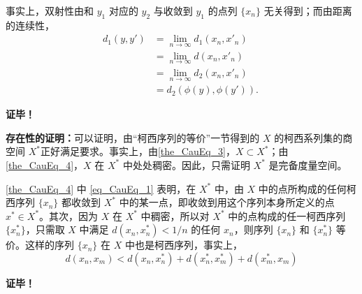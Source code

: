 事实上，双射性由和 $y_1$ 对应的 $y_2$ 与收敛到 $y_1$ 的点列 $\{x_n\}$ 无关得到；而由距离的连续性，
\begin{equation}
\begin{aligned}
d_1(y,y')&=\lim_{n\rightarrow\infty} d_1(x_n,x'_n)\\
&=\lim_{n\rightarrow\infty} d(x_n,x'_n)\\
&=\lim_{n\rightarrow\infty} d_2(x_n,x'_n)\\
&=d_2(\phi(y),\phi(y')).
\end{aligned}~
\end{equation}

\textbf{证毕！}

\textbf{存在性的证明：}可以证明，由“柯西序列的等价”一节得到的 $X$ 的柯西系列集的商空间 $X^*$正好满足要求。事实上，由\autoref{the_CauEq_3}，$X\subset X^*$；由\autoref{the_CauEq_4}，$X$ 在 $X^*$ 中处处稠密。因此，只需证明 $X^*$ 是完备度量空间。

\autoref{the_CauEq_4} 中 \autoref{eq_CauEq_1} 表明，在 $X^*$ 中，由 $X$ 中的点所构成的任何柯西序列 $\{x_n\}$ 都收敛到 $X^*$ 中的某一点，即收敛到用这个序列本身所定义的点 $x^*\in X^*$。其次，因为 $X$ 在 $X^*$ 中稠密，所以对 $X^*$ 中的点构成的任一柯西序列 $\{x_n^*\}$，只需取 $X$ 中满足 $d(x_n,x_n^*)<1/n$ 的任何 $x_n$，则序列 $\{x_n\}$ 和 $\{x_n^*\}$ 等价。这样的序列 $\{x_n\}$ 在 $X$ 中也是柯西序列，事实上，
\begin{equation}
d(x_n,x_m)<d(x_n,x_n^*)+d(x_n^*,x_m^*)+d(x_m^*,x_m)
\end{equation}





\textbf{证毕！}